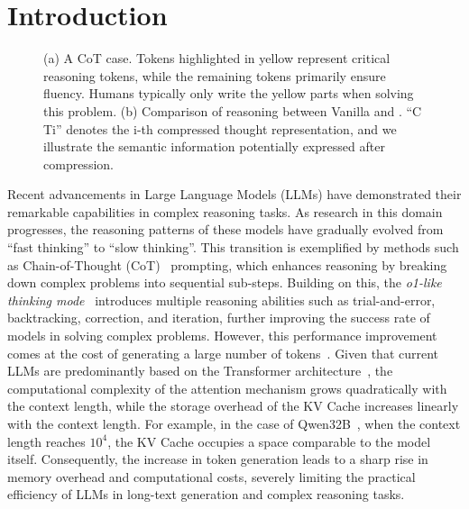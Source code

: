 
\section{Introduction}

\begin{figure}[!t] %
    \centering
    \caption{
    (a) A CoT case. Tokens highlighted in yellow represent critical reasoning tokens, while the remaining tokens primarily ensure fluency. 
    Humans typically only write the yellow parts when solving this problem.
    (b) Comparison of reasoning between Vanilla and \ours. 
    ``C Ti'' denotes the i-th compressed thought representation, and we illustrate the semantic information potentially expressed after compression.
    }
    \label{fig:intro}
    \vspace{-1mm}
\end{figure} 

Recent advancements in Large Language Models (LLMs) have demonstrated their remarkable capabilities in complex reasoning tasks. 
As research in this domain progresses, the reasoning patterns of these models have gradually evolved from ``fast thinking'' to ``slow thinking''. 
This transition is exemplified by methods such as Chain-of-Thought (CoT)~\citep{nips22_cot} prompting, which enhances reasoning by breaking down complex problems into sequential sub-steps.  
Building on this, the \textit{o1-like thinking mode}~\citep{arixv24_o1,arxiv24_qwq,arxiv25_deepseek_r1} introduces multiple reasoning abilities such as trial-and-error, backtracking, correction, and iteration, further improving the success rate of models in solving complex problems. 
However, this performance improvement comes at the cost of generating a large number of tokens~\citep{arxiv24_o1_study}. 
Given that current LLMs are predominantly based on the Transformer architecture~\citep{nips17_transformer}, the computational complexity of the attention mechanism grows quadratically with the context length, while the storage overhead of the KV Cache increases linearly with the context length.
For example, in the case of Qwen32B~\citep{arxiv24_qwen2_5}, when the context length reaches \(10^4\), the KV Cache occupies a space comparable to the model itself. 
Consequently, the increase in token generation leads to a sharp rise in memory overhead and computational costs, severely limiting the practical efficiency of LLMs in long-text generation and complex reasoning tasks.

